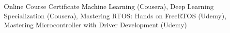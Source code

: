 

\begin{cvskills}

  \cvskill
    {Online Course Certificate} %
    {Machine Learning (Cousera), Deep Learning Specialization (Cousera), 
    Mastering RTOS: Hands \linebreak on FreeRTOS (Udemy), 
    Mastering Microcontroller with Driver Development (Udemy)} %


\end{cvskills}
